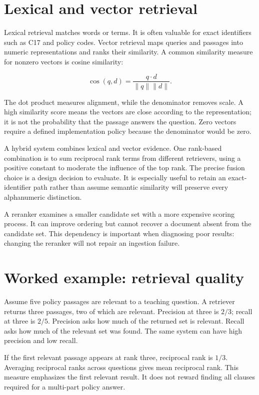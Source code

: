 \section{Lexical and vector retrieval}
Lexical retrieval matches words or terms. It is often valuable for exact identifiers such as C17 and policy codes. Vector retrieval maps queries and passages into numeric representations and ranks their similarity. A common similarity measure for nonzero vectors is cosine similarity:

\begin{equation}
\operatorname{cos}(q,d)=\frac{q\cdot d}{\lVert q\rVert\lVert d\rVert}.
\end{equation}

The dot product measures alignment, while the denominator removes scale. A high similarity score means the vectors are close according to the representation; it is not the probability that the passage answers the question. Zero vectors require a defined implementation policy because the denominator would be zero.

A hybrid system combines lexical and vector evidence. One rank-based combination is to sum reciprocal rank terms from different retrievers, using a positive constant to moderate the influence of the top rank. The precise fusion choice is a design decision to evaluate. It is especially useful to retain an exact-identifier path rather than assume semantic similarity will preserve every alphanumeric distinction.

A reranker examines a smaller candidate set with a more expensive scoring process. It can improve ordering but cannot recover a document absent from the candidate set. This dependency is important when diagnosing poor results: changing the reranker will not repair an ingestion failure.

\section{Worked example: retrieval quality}
Assume five policy passages are relevant to a teaching question. A retriever returns three passages, two of which are relevant. Precision at three is \(2/3\); recall at three is \(2/5\). Precision asks how much of the returned set is relevant. Recall asks how much of the relevant set was found. The same system can have high precision and low recall.

If the first relevant passage appears at rank three, reciprocal rank is \(1/3\). Averaging reciprocal ranks across questions gives mean reciprocal rank. This measure emphasizes the first relevant result. It does not reward finding all clauses required for a multi-part policy answer.


